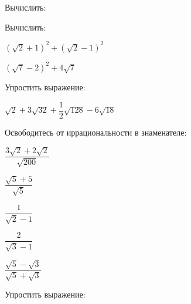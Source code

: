 \begin{listofex}
	\item Вычислить:
	\begin{enumcols}[itemcolumns=3]
		\item {}
		\item {}
		\item {}
		\item {}
		\item {}
		\item {}
	\end{enumcols}
	\item Вычислить:
	\begin{enumcols}[itemcolumns=3]
		\item {}
		\item {}
		\item {}
		\item {}
		\item \( (\sqrt{2}+1)^2+(\sqrt{2}-1)^2 \)
		\item \( (\sqrt{7}-2)^2+4\sqrt{7} \)
	\end{enumcols}
	\item Упростить выражение:
	\begin{enumcols}[itemcolumns=2]
		\item \( \sqrt{2}+3\sqrt{32}+\dfrac{1}{2}\sqrt{128}-6\sqrt{18} \)
		\item {}
		\item {}
		\item {}
		\item {}
	\end{enumcols}
	\item Освободитесь от иррациональности в знаменателе:
	\begin{enumcols}[itemcolumns=5]
		\item \( \dfrac{3\sqrt{2}+2\sqrt{2}}{\sqrt{200}} \)
		\item \( \dfrac{\sqrt{5}+5}{\sqrt{5}} \)
		\item \( \dfrac{1}{\sqrt{2}-1} \)
		\item \( \dfrac{2}{\sqrt{3}-1} \)
		\item \( \dfrac{\sqrt{5}-\sqrt{3}}{\sqrt{5}+\sqrt{3}} \)
	\end{enumcols}
	\item Упростить выражение:
	\begin{enumcols}[itemcolumns=3]

\end{enumcols}
\end{listofex}
